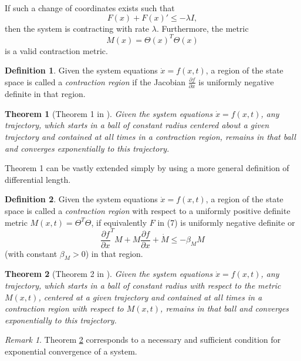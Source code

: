 \documentclass{article}
\newtheorem{theorem}{Theorem}
\theoremstyle{definition} \newtheorem{definition}{Definition}
\theoremstyle{remark} \newtheorem{remark}{Remark}
\newcounter{ct}
\begin{document}
If such a change of coordinates exists such that
\[
F(x) + F(x)' \leq -\lambda I,
\]
then the system is contracting with rate \( \lambda \). Furthermore, the metric
\[
M(x) = \Theta(x)^T \Theta(x)
\]
is a valid contraction metric.

\begin{definition}
Given the system equations \(\dot{x} = f(x, t)\), a region of the state space is called a \textit{contraction region} if the Jacobian \(\frac{\partial f}{\partial x}\) is uniformly negative definite in that region.
\end{definition}

\begin{theorem}[Theorem 1 in \citep{lohmiller1998contraction}]\label{thrm:contractive_ball}
Given the system equations  $\dot x = f(x, t)$, any trajectory, which starts in a ball of constant radius centered about a given trajectory and contained at all times in a contraction region, remains in that ball and converges exponentially to this trajectory.
\end{theorem}

Theorem 1 can be vastly extended simply by using a more general definition of differential length.


\begin{definition}
Given the system equations \(\dot{x} = f(x, t)\), a region of the state space is called a \textit{contraction region} with respect to a uniformly positive definite metric \( M(x, t) = \Theta^T \Theta \), if equivalently \( F \) in (7) is uniformly negative definite or  
\[
\frac{\partial f}{\partial x}^T M + M \frac{\partial f}{\partial x} + \dot{M} \leq -\beta_M M
\]
(with constant \( \beta_M > 0 \)) in that region.
\end{definition}

\begin{theorem}[Theorem 2 in \citep{lohmiller1998contraction}]\label{thrm:contractive}
Given the system equations $\dot x = f(x,t)$, any trajectory, which starts in a ball of constant radius with respect to the metric $M(x,t)$, centered at a given trajectory and contained at all times in a contraction region with respect to $M(x,t)$,  remains in that ball and converges exponentially to this trajectory.
\end{theorem}

\begin{remark}
Theorem \ref{thrm:contractive} corresponds to a necessary and sufficient condition for exponential convergence of a system. 
\end{remark}
\end{document}
